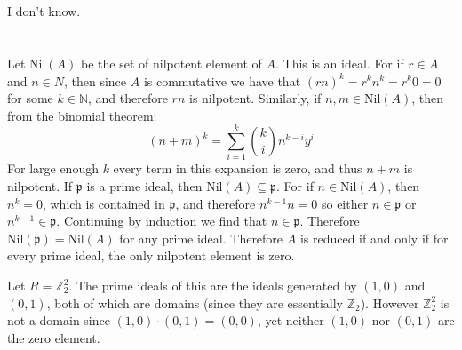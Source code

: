 \documentclass[crop=false,class=article]{standalone}                           %
\begin{document}
    \section{}
        I don't know.
    \section{}
        Let $\textrm{Nil}(A)$ be the set of nilpotent element of $A$. This is an
        ideal. For if $r\in{A}$ and $n\in{N}$, then since $A$ is commutative we
        have that $(rn)^{k}=r^{k}n^{k}=r^{k}0=0$ for some $k\in\mathbb{N}$, and
        therefore $rn$ is nilpotent. Similarly, if $n,m\in\textrm{Nil}(A)$, then
        from the binomial theorem:
        \begin{equation}
            (n+m)^{k}=\sum_{i=1}^{k}\binom{k}{i}n^{k-i}y^{i}
        \end{equation}
        For large enough $k$ every term in this expansion is zero, and thus
        $n+m$ is nilpotent. If $\mathfrak{p}$ is a prime ideal, then
        $\textrm{Nil}(A)\subseteq\mathfrak{p}$. For if $n\in\textrm{Nil}(A)$,
        then $n^{k}=0$, which is contained in $\mathfrak{p}$, and therefore
        $n^{k-1}n=0$ so either $n\in\mathfrak{p}$ or $n^{k-1}\in\mathfrak{p}$.
        Continuing by induction we find that $n\in\mathfrak{p}$. Therefore
        $\textrm{Nil}(\mathfrak{p})=\textrm{Nil}(A)$ for any prime ideal.
        Therefore $A$ is reduced if and only if for every prime ideal, the
        only nilpotent element is zero.
        \par\hfill\par
        Let $R=\mathbb{Z}_{2}^{2}$. The prime ideals of this are the ideals
        generated by $(1,0)$ and $(0,1)$, both of which are domains
        (since they are essentially $\mathbb{Z}_{2}$). However
        $\mathbb{Z}_{2}^{2}$ is not a domain since $(1,0)\cdot(0,1)=(0,0)$,
        yet neither $(1,0)$ nor $(0,1)$ are the zero element.
\end{document}
